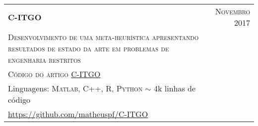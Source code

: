\begin{tabular}{p{11cm}|r}
  \textbf{C-ITGO}  & \textsc{Novembro 2017} \\
  \textsc{Desenvolvimento de uma meta-heurística apresentando resultados de estado da arte em problemas de engenharia restritos} & \\
  \textsc{Código do artigo \hyperref[C-ITGO]{C-ITGO}} & \\
  \footnotesize{Linguagens: \textsc{Matlab}, \textsc{C++}, \textsc{R}, \textsc{Python}}  \hspace{0.5cm} $\sim$ 4k linhas de código & \\
  \footnotesize{\url{https://github.com/matheuspf/C-ITGO}} & \\
\end{tabular}\\
